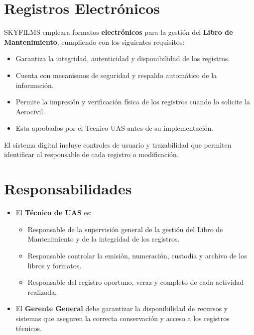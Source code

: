 \section{Registros Electrónicos}
SKYFILMS empleara formatos \textbf{electrónicos} para la gestión del \textbf{Libro de Mantenimiento}, cumpliendo con los siguientes requisitos:

\begin{itemize}
    \item Garantiza la integridad, autenticidad y disponibilidad de los registros.

    \item Cuenta con mecanismos de seguridad y respaldo automático de la información.

    \item Permite la impresión y verificación física de los registros cuando lo solicite la Aerocivil.

    \item Esta aprobados por el Tecnico UAS antes de su implementación.
\end{itemize}

El sistema digital incluye controles de usuario y trazabilidad que permiten identificar al responsable de cada registro o modificación.

\section{Responsabilidades}
\begin{itemize}
    \item El \textbf{Técnico de UAS} es:
        \begin{itemize}
            \item Responsable de la supervisión general de la gestión del Libro de Mantenimiento y de la integridad de los registros.

            \item Responsable controlar la emisión, numeración, custodia y archivo de los libros y formatos.

            \item Responsable del registro oportuno, veraz y completo de cada actividad realizada.
        \end{itemize}

    \item El \textbf{Gerente General} debe garantizar la disponibilidad de recursos y sistemas que aseguren la correcta conservación y acceso a los registros técnicos.
\end{itemize}

